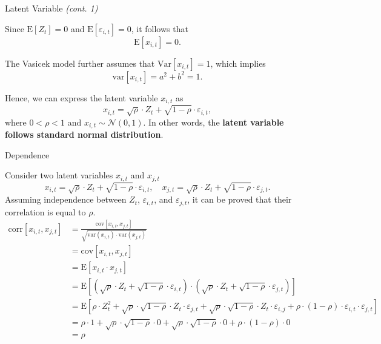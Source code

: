 \documentclass{beamer}
\begin{document}
\begin{frame}{Latent Variable \textit{(cont. 1)}}
\justifying
\small

Since $\mathrm{E}[Z_t] = 0$ and $\mathrm{E}[\varepsilon_{i,t}] = 0$, it follows that
\begin{equation*}
\mathrm{E}[x_{i,t}] = 0.
\end{equation*}

The Vasicek model further assumes that $\mathrm{Var}[x_{i,t}] = 1$, which implies
\begin{equation*}
\mathrm{var}[x_{i,t}] = a^2 + b^2 = 1.
\end{equation*}

\medskip

Hence, we can express the latent variable $x_{i,t}$ as
\begin{equation}
x_{i,t} = \sqrt{\rho} \cdot Z_t + \sqrt{1 - \rho} \cdot \varepsilon_{i,t},
\end{equation}
where $0 < \rho < 1$ and $x_{i,t} \sim \mathcal{N}(0,1)$. In other words, the \textbf{latent variable follows standard normal distribution}.

\end{frame}

\begin{frame}{Dependence}
\justifying
\small

Consider two latent variables $x_{i, t}$ and $x_{j, t}$
{\tiny
\begin{equation*}
x_{i,t} = \sqrt{\rho}\cdot Z_t + \sqrt{1 - \rho} \cdot \varepsilon_{i,t}, \quad x_{j,t} = \sqrt{\rho} \cdot Z_t + \sqrt{1 - \rho} \cdot \varepsilon_{j,t}.
\end{equation*}
}
Assuming independence between $Z_t$, $\varepsilon_{i, t}$, and $\varepsilon_{j, t}$, it can be proved that their correlation is equal to $\rho$.
{\tiny
\begin{align*}
\mathrm{corr}[x_{i, t}, x_{j, t}] &= \frac{\mathrm{cov}[x_{i, t}, x_{j, t}]}{\sqrt{\mathrm{var}(x_{i,t})\cdot  \mathrm{var}(x_{j, t})}} \nonumber \\
&= \mathrm{cov}[x_{i, t}, x_{j, t}] \nonumber \\
&= \mathrm{E}[x_{i, t} \cdot x_{j, t}] \nonumber \\
&= \mathrm{E}[(\sqrt{\rho} \cdot Z_t + \sqrt{1 - \rho} \cdot \varepsilon_{i, t}) \cdot (\sqrt{\rho} \cdot Z_t + \sqrt{1 - \rho} \cdot \varepsilon_{j, t})] \nonumber \\
&= \mathrm{E}[\rho \cdot Z_t^2 + \sqrt{\rho} \cdot \sqrt{1 - \rho} \cdot Z_t \cdot \varepsilon_{j, t} + \sqrt{\rho} \cdot \sqrt{1 - \rho} \cdot Z_t \cdot \varepsilon_{i, j} + \rho \cdot (1 - \rho) \cdot \varepsilon_{i, t} \cdot \varepsilon_{j, t}] \nonumber \\
&= \rho \cdot 1 + \sqrt{\rho} \cdot \sqrt{1 - \rho} \cdot 0 + \sqrt{\rho} \cdot \sqrt{1 - \rho} \cdot 0 + \rho \cdot (1 - \rho) \cdot 0 \nonumber \\
&= \rho
\end{align*}
}

\end{frame}
\end{document}
